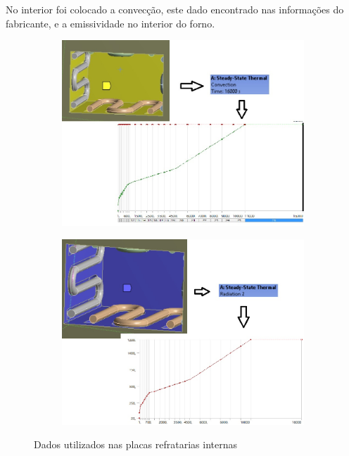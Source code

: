 No interior foi colocado a convecção, este dado encontrado nas informações do fabricante, e
a emissividade no interior do forno.
\begin{figure}[H]
\centering
    \begin{subfigure}{0.49\linewidth} \centering
        \includegraphics[scale=0.5]{figuras/ansys4.jpg}
        \label{ansys4}
    \end{subfigure}
    \begin{subfigure}{0.49\linewidth} \centering
        \includegraphics[scale=0.5]{figuras/ansys7.jpg}
        \label{ansys7}
    \end{subfigure}
    \caption{Dados utilizados nas placas refratarias internas}
\end{figure}


